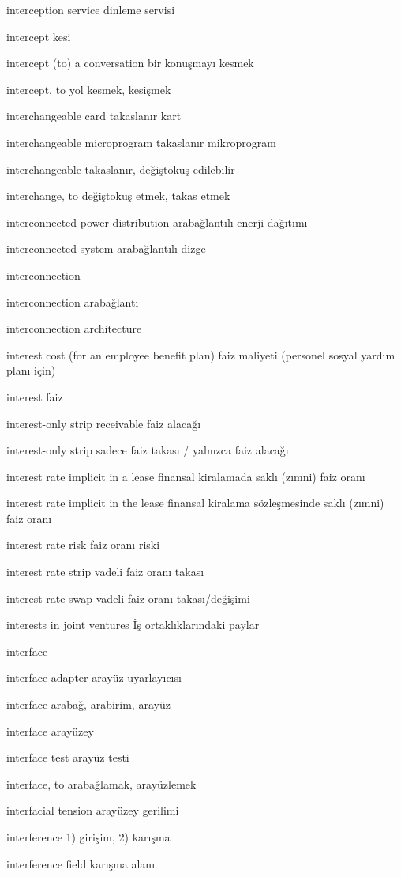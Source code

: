 \documentclass[12pt,fleqn]{article}\usepackage{../../common}
\begin{document}
interception service dinleme servisi

intercept kesi

intercept (to) a conversation bir konuşmayı kesmek

intercept, to yol kesmek, kesişmek

interchangeable card takaslanır kart

interchangeable microprogram takaslanır mikroprogram

interchangeable takaslanır, değiştokuş edilebilir

interchange, to değiştokuş etmek, takas etmek

interconnected power distribution arabağlantılı enerji dağıtımı

interconnected system arabağlantılı dizge

interconnection

interconnection arabağlantı

interconnection architecture

interest cost (for an employee benefit plan) faiz maliyeti (personel sosyal yardım planı için)

interest faiz

interest-only strip receivable faiz alacağı

interest-only strip sadece faiz takası / yalnızca faiz alacağı

interest rate implicit in a lease finansal kiralamada saklı (zımni) faiz oranı

interest rate implicit in the lease finansal kiralama sözleşmesinde saklı (zımni) faiz oranı

interest rate risk faiz oranı riski

interest rate strip vadeli faiz oranı takası

interest rate swap vadeli faiz oranı takası/değişimi

interests in joint ventures İş ortaklıklarındaki paylar

interface

interface adapter arayüz uyarlayıcısı

interface arabağ, arabirim, arayüz

interface arayüzey

interface test arayüz testi

interface, to arabağlamak, arayüzlemek

interfacial tension arayüzey gerilimi

interference 1) girişim, 2) karışma

interference field karışma alanı
\end{document}

